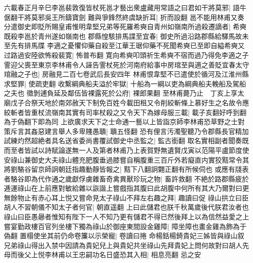 六載春正月辛巳李邕裴敦復皆杖死邕才藝出衆盧藏用常語之曰君如干將莫邪|{
	語牛倨翻干將莫邪吳王所鑄寶劍}
難與爭鋒然終虞缺折耳|{
	折而設翻}
邕不能用林甫又奏分遣御史即貶所賜皇甫惟明韋堅兄弟等死羅希奭自青州如嶺南所過殺遷謫者|{
	希奭既殺李邕於青州遂如嶺南也}
郡縣惶駭排馬諜至宜春|{
	御史所過沿路郡縣給驛馬故未至先有排馬牒}
李適之憂懼仰藥自殺至江華王琚仰藥不死聞希奭已至即自縊希奭又过路過安陸欲怖殺裴寛|{
	怖普布翻}
寛向希奭叩頭祈生希奭不宿而過乃得免李適之子霅迎父喪至東京李林甫令人誣告霅杖死於河南府給事中房琯至與適之善貶宜春太守琯融之子也|{
	房融見二百七卷武后長安四年}
林甫恨韋堅不已遣使於循河及江淮州縣求堅罪|{
	使疏吏翻}
收繫綱典船夫溢於牢獄|{
	十船為一綱以吏為綱典船夫輓船及駕船之夫也}
徵剝逋負延及鄰伍皆裸露死於公府|{
	裸郎果翻}
至林甫薨乃止　丁亥上享太廟戊子合祭天地於南郊赦天下制免百姓今載田租又令削絞斬條上慕好生之名故令應絞斬者皆重杖流嶺南其實有司率杖殺之又令天下為嫁母服三載|{
	載子亥翻好呼到翻為于偽翻下即為同}
上欲廣求天下之士命通一藝以上皆詣京師李林甫恐草野之士對策斥言其姦惡建言舉人多卑賤愚聵|{
	聵五怪翻}
恐有俚言汚濁聖聽乃令郡縣長官精加試練灼然超絶者具名送省委尚書覆試御史中丞監之|{
	監古銜翻}
取名實相副者聞奏既而至者皆試以詩賦論遂無一人及第者林甫乃上表賀野無遺賢戊寅以范陽平盧節度使安祿山兼御史大夫祿山體充肥腹垂過膝嘗自稱腹重三百斤外若癡直内實狡黠常令其將劉駱谷留京師詗朝廷指趣動靜皆報之|{
	黠下八翻詗翾正翻有所候伺也}
或應有牋表者駱谷即為代作通之歲獻俘虜雜畜奇禽異獸珍玩之物|{
	畜許救翻}
不絶於路郡縣疲於逓運祿山在上前應對敏給雜以詼諧上嘗戲指其腹曰此胡腹中何所有其大乃爾對曰更無餘物止有赤心耳上悦又嘗命見太子祿山不拜左右趣之拜|{
	趣讀曰促}
祿山拱立曰臣胡人不習朝儀不知太子者何官|{
	朝直遥翻}
上曰此儲君也朕千秋萬歲後代朕君汝者也祿山曰臣愚曏者惟知有陛下一人不知乃更有儲君不得已然後拜上以為信然益愛之上嘗宴勤政樓百官列坐樓下獨為祿山於御座東間設金雞障|{
	障坐障也畫金雞為飾為于偽翻}
置榻使坐其前仍命卷簾以示榮寵|{
	卷讀曰捲}
命楊銛楊錡貴妃三姊皆與祿山叙兄弟祿山得出入禁中因請為貴妃兒上與貴妃共坐祿山先拜貴妃上問何故對曰胡人先母而後父上悦李林甫以王忠嗣功名日盛恐其入相|{
	相息亮翻}
忌之安

